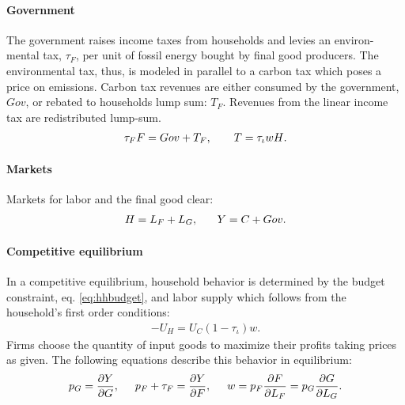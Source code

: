 \paragraph{Government}
The government raises income taxes from households and levies an environ- mental tax, $\tau_F$, per unit of fossil energy bought by final good producers. The environmental tax, thus, is modeled in parallel to a carbon tax which poses a price on emissions. Carbon tax revenues are either consumed by the government, $Gov$, or rebated to households lump sum: $T_F$. Revenues from the linear income tax are redistributed lump-sum. \begin{align}
	\tau_{F}F=Gov+T_F, \hspace{7mm}
	T=\tau_{\iota}{w H}. \label{eq:gov_but}
\end{align}

\paragraph{Markets}
Markets for labor and the final good clear: 
\begin{align}
	H=L_F+L_G,\ \hspace{5mm} Y=C+Gov. \label{eq:market_clear}
\end{align}
\paragraph{Competitive equilibrium}
In a competitive equilibrium, household behavior is determined by the budget constraint, eq. \eqref{eq:hhbudget}, and labor supply which follows from the household's first order conditions:
\begin{align}
	-U_H=U_C(1-\tau_{\iota})w. \label{eq:hsup}
\end{align}
Firms choose the quantity of input goods to maximize their profits taking prices as given. The following equations describe this behavior in equilibrium:
\begin{align}
	p_G=\frac{\partial Y}{\partial G}, \hspace{5mm}
	p_F +\tau_{F} = \frac{\partial Y}{\partial F}, \hspace{5mm}
	w= p_F\frac{\partial F}{\partial L_F}=p_G\frac{\partial G}{\partial L_G}.\label{eq:profmax}
\end{align}

